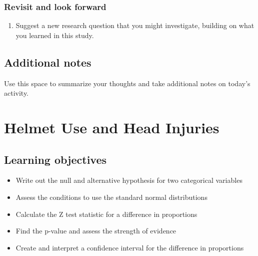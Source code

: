 \documentclass[
]{report}
\providecommand{\tightlist}{%
  \setlength{\itemsep}{0pt}\setlength{\parskip}{0pt}}
\begin{document}
\vspace{3in}

\hypertarget{revisit-and-look-forward}{%
\subsection{Revisit and look forward}\label{revisit-and-look-forward}}

\begin{enumerate}
\def\labelenumi{\arabic{enumi}.}
\setcounter{enumi}{28}
\tightlist
\item
  Suggest a new research question that you might investigate, building on what you learned in this study.
\end{enumerate}

\vspace{1in}

\hypertarget{additional-notes}{%
\section{Additional notes}\label{additional-notes}}

Use this space to summarize your thoughts and take additional notes on today's activity.

\hypertarget{helmet-use-and-head-injuries}{%
\chapter{Helmet Use and Head Injuries}\label{helmet-use-and-head-injuries}}

\hypertarget{learning-objectives}{%
\section{Learning objectives}\label{learning-objectives}}

\begin{itemize}
\item
  Write out the null and alternative hypothesis for two categorical variables
\item
  Assess the conditions to use the standard normal distributions
\item
  Calculate the Z test statistic for a difference in proportions
\item
  Find the p-value and assess the strength of evidence
\item
  Create and interpret a confidence interval for the difference in proportions
\end{itemize}
\end{document}

